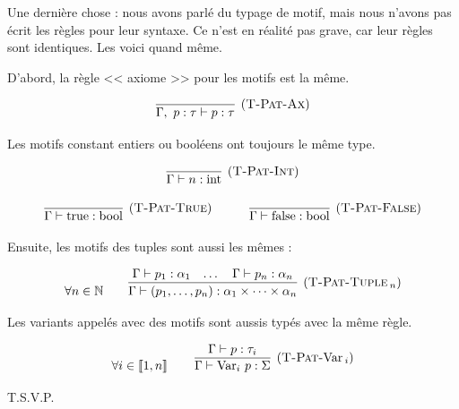 \documentclass[11pt]{article}
\begin{document}
Une dernière chose : nous avons parlé du typage de motif, mais nous n'avons pas écrit les règles pour leur syntaxe. Ce n'est en réalité pas grave, car leur règles sont identiques. Les voici quand 
même.

D'abord, la règle << axiome >> pour les motifs est la même.

$$
\infer[(\text{\scshape{T-Pat-Ax}})] 
{\Gamma,~p:\tau\vdash p:\tau}{}
$$

Les motifs constant entiers ou booléens ont toujours le même type.

$$
\infer[(\text{\scshape{T-Pat-Int}})] 
{\Gamma\vdash n:\text{int}}{}
$$

$$
\infer[(\text{\scshape{T-Pat-True}})] 
{\Gamma\vdash \text{true}:\text{bool}}{}
~~~~~~~~~
\infer[(\text{\scshape{T-Pat-False}})] 
{\Gamma\vdash \text{false}:\text{bool}}{}
$$

Ensuite, les motifs des tuples sont aussi les mêmes :

$$
\forall n\in\mathbb{N}~~~~~~
\infer[(\text{\scshape{T-Pat-Tuple$\,_n$}})]
{\Gamma\vdash (p_1, \dots, p_n) : \alpha_1\times\dots\times\alpha_n}
{
    \Gamma\vdash p_1:\alpha_1&
    \dots&
    \Gamma\vdash p_n:\alpha_n
}
$$

Les variants appelés avec des motifs sont aussis typés avec la même règle.

$$\forall i\in\left\llbracket1, n\right\rrbracket~~~~~~
\infer[(\text{{\scshape{T-Pat-}}\text{Var}$\,_i$})]
{\Gamma \vdash \text{Var}_i~p:\Sigma}
{\Gamma \vdash p:\tau_i}
$$


T.S.V.P.
\end{document}
